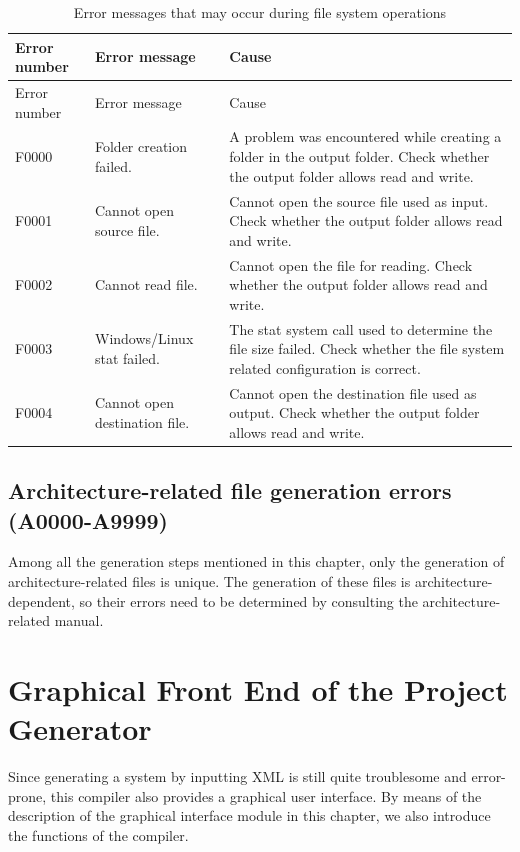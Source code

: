 \begin{xltabular}{\textwidth}{@{}>{\hsize\raggedright\arraybackslash}X>{\hsize\raggedright\arraybackslash}X>{\hsize\raggedright\arraybackslash}X@{}}
\caption{Error messages that may occur during file system operations}\label{tab:5-29}\\
\toprule
Error number & Error message & Cause\tabularnewline
\endfirsthead
\toprule
Error number & Error message & Cause\tabularnewline
\midrule
\endhead
\bottomrule
\endlastfoot
F0000 & Folder creation failed. &
A problem was encountered while creating a folder in the output folder. Check whether the output folder allows read and write.\tabularnewline
F0001 & Cannot open source file. &
Cannot open the source file used as input. Check whether the output folder allows read and write.\tabularnewline
F0002 & Cannot read file. &
Cannot open the file for reading. Check whether the output folder allows read and write.\tabularnewline
F0003 & Windows/Linux stat failed. &
The stat system call used to determine the file size failed. Check whether the file system related configuration is correct.\tabularnewline
F0004 & Cannot open destination file. &
Cannot open the destination file used as output. Check whether the output folder allows read and write.\tabularnewline
\end{xltabular}

\subsection{Architecture-related file generation errors (A0000-A9999)}\label{subsec:5-6-12}

Among all the generation steps mentioned in this chapter, only the generation of architecture-related files is unique. The generation of these files is architecture-dependent, so their errors need to be determined by consulting the architecture-related manual.


\section{Graphical Front End of the Project Generator}\label{sec:5-7}

Since generating a system by inputting XML is still quite troublesome and error-prone, this compiler also provides a graphical user interface. By means of the description of the graphical interface module in this chapter, we also introduce the functions of the compiler.


